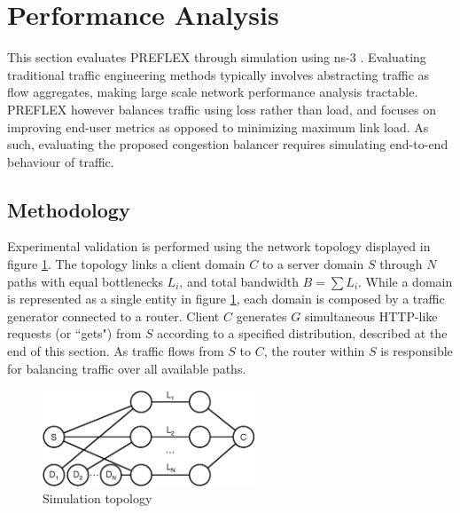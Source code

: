 \section{Performance Analysis}

This section evaluates \ac{PREFLEX} through simulation using ns-3 \cite{ns3}. 
Evaluating traditional traffic engineering methods typically involves abstracting traffic as flow aggregates, making large scale network performance analysis tractable.
\ac{PREFLEX} however balances traffic using loss rather than load, and focuses on improving end-user metrics as opposed to minimizing maximum link load.
As such, evaluating the proposed congestion balancer requires simulating end-to-end behaviour of traffic.

\subsection{Methodology}
\label{section:methodology}

Experimental validation is performed using the network topology displayed in figure \ref{fig:topo}. 
The topology links a client domain $C$ to a server domain $S$ through $N$ paths with equal bottlenecks $L_i$, and total bandwidth $B=\sum{L_i}$. 
While a domain is represented as a single entity in figure \ref{fig:topo}, each domain is composed by a traffic generator connected to a router. 
Client $C$ generates $G$ simultaneous \ac{HTTP}-like requests (or ``gets") from $S$ according to a specified distribution, described at the end of this section. 
As traffic flows from $S$ to $C$, the router within $S$ is responsible for balancing traffic over all available paths.

\begin{figure}
    \centering
    \includegraphics[width=2.5in]{figures/cate/topo}
    \caption{Simulation topology}
    \label{fig:topo}
\end{figure}

